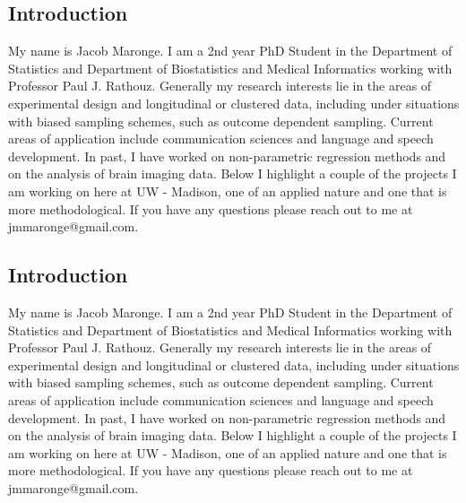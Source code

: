 \documentclass[12pt]{article}
\begin{document}
\begin{multicols}{2}
\subsection*{Introduction}
My name is Jacob Maronge. I am a 2nd year PhD Student in the Department of Statistics and Department of Biostatistics and Medical Informatics working with Professor Paul J. Rathouz. Generally my research interests lie in the areas of experimental design and longitudinal or clustered data, including under situations with biased sampling schemes, such as outcome dependent sampling. Current areas of application include communication sciences and language and speech development. In past, I have worked on non-parametric regression methods and on the analysis of brain imaging data. Below I highlight a couple of the projects I am working on here at UW - Madison, one of an applied nature and one that is more methodological. If you have any questions please reach out to me at jmmaronge@gmail.com.
\subsection*{Introduction}
My name is Jacob Maronge. I am a 2nd year PhD Student in the Department of Statistics and Department of Biostatistics and Medical Informatics working with Professor Paul J. Rathouz. Generally my research interests lie in the areas of experimental design and longitudinal or clustered data, including under situations with biased sampling schemes, such as outcome dependent sampling. Current areas of application include communication sciences and language and speech development. In past, I have worked on non-parametric regression methods and on the analysis of brain imaging data. Below I highlight a couple of the projects I am working on here at UW - Madison, one of an applied nature and one that is more methodological. If you have any questions please reach out to me at jmmaronge@gmail.com.



\end{multicols}
\end{document}
